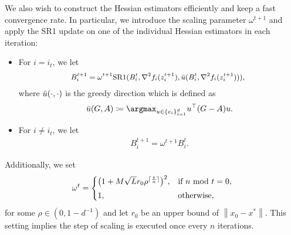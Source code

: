\documentclass[letterpaper]{article} %
\theoremstyle{plain}
\theoremstyle{definition}
\theoremstyle{remark}
\DeclarePairedDelimiter\ceil{\lceil}{\rceil}
\newcommand\norm[1]{\left\lVert#1\right\rVert}
\def\BR{{\mathbb{R}}}
\begin{document}
We also wish to construct the Hessian estimators efficiently and keep a fast convergence rate.
In particular, we introduce the scaling parameter $\omega^{t+1}$ and apply the SR1 update on one of the individual Hessian estimators in each iteration:
\begin{itemize}
\item For $i=i_t$, we let
\begin{equation}\label{greedy_sr1_update-0}
\small\begin{split}    
    \!\!\!B_{i}^{t+1} = \omega^{t+1} \textrm{SR1}(B_{i}^{t}, \nabla^2 f_{i}(z_{i}^{t+1}), \Bar{u}(B_{i}^{t}, \nabla^2 f_{i}(z_{i}^{t+1}))), 
\end{split}
\end{equation}
where $\Bar u(\cdot,\cdot)$ is the greedy direction which is defined as
\begin{align}\label{sr_greedy_vec}    
\Bar{u}(G, A) 
\coloneqq\argmax_{u \in \{ e_i \}_{i=1}^d } u^{\top} (G-A) u.
\end{align}
\item For $i\neq i_t$, we let
\begin{equation}\label{greedy_sr1_update-1}
\begin{split}    
    B_{i}^{t+1} = \omega^{t+1} B_{i}^{t}. 
\end{split}
\end{equation}
\end{itemize}
Additionally, we set 
\begin{align}\label{greedy_sr1_omega}
\omega^t = \begin{cases}
\big(1 + M \sqrt{L}r_0 \rho^{\ceil{\frac{t}{n}}}\big)^2,   & \text{if}~n~{\rm mod}~t = 0, \\[0.1cm] 
1, & \text{otherwise}, 
\end{cases}    
\end{align}
for some $\rho\in(0,1-d^{-1})$ and let $r_0$ be an upper bound of $\norm{x_0-x^*}$.
This setting implies the step of scaling is executed once every $n$ iterations. 



\end{document}

